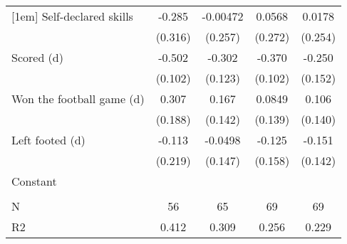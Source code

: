 {\begin{tabular}{l*{4}{c}}
[1em]
Self-declared skills&      -0.285         &    -0.00472         &      0.0568         &      0.0178         \\
                    &     (0.316)         &     (0.257)         &     (0.272)         &     (0.254)         \\
[1em]
Scored (d)          &      -0.502\sym{***}&      -0.302\sym{**} &      -0.370\sym{***}&      -0.250         \\
                    &     (0.102)         &     (0.123)         &     (0.102)         &     (0.152)         \\
[1em]
Won the football game (d)&       0.307         &       0.167         &      0.0849         &       0.106         \\
                    &     (0.188)         &     (0.142)         &     (0.139)         &     (0.140)         \\
[1em]
Left footed (d)     &      -0.113         &     -0.0498         &      -0.125         &      -0.151         \\
                    &     (0.219)         &     (0.147)         &     (0.158)         &     (0.142)         \\
[1em]
Constant            &                     &                     &                     &                     \\
                    &                     &                     &                     &                     \\
\hline
N                   &          56         &          65         &          69         &          69         \\
R2                  &       0.412         &       0.309         &       0.256         &       0.229         \\
\hline\hline
\end{tabular}
}
